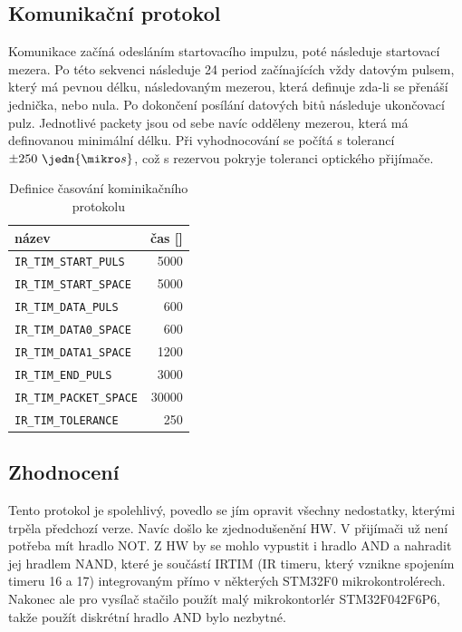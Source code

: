 \subsection{Komunikační protokol}
Komunikace začíná odesláním startovacího impulzu, poté následuje startovací mezera. Po této sekvenci následuje 24 period začínajících vždy datovým pulsem, který má pevnou délku, následovaným mezerou, která definuje zda-li se přenáší jednička, nebo nula. Po dokončení posílání datových bitů následuje ukončovací pulz. Jednotlivé packety jsou od sebe navíc odděleny mezerou, která má definovanou minimální délku. Při vyhodnocování se počítá s tolerancí $\pm250~\jedn{\mikro s}$, což s rezervou pokryje toleranci optického přijímače.

\begin{table}[H]
  \caption{Definice časování kominikačního protokolu}
  \begin{center}
  	\small
	  \begin{tabular}{|l|r|}
	    \hline
	    \textbf{název} & \textbf{čas [\jedn{\mikro s}]} \\\hline\hline
	    \texttt{IR\_TIM\_START\_PULS}       &  5000     \\\hline
	    \texttt{IR\_TIM\_START\_SPACE}      &  5000     \\\hline
	    \texttt{IR\_TIM\_DATA\_PULS}        &   600     \\\hline
	    \texttt{IR\_TIM\_DATA0\_SPACE}      &   600     \\\hline
        \texttt{IR\_TIM\_DATA1\_SPACE}      &  1200     \\\hline
        \texttt{IR\_TIM\_END\_PULS}         &  3000     \\\hline
        \texttt{IR\_TIM\_PACKET\_SPACE}     & 30000     \\\hline
        \texttt{IR\_TIM\_TOLERANCE}         &   250     \\\hline
	  \end{tabular}
  \end{center}
\end{table}



\subsection{Zhodnocení}
Tento protokol je spolehlivý, povedlo se jím opravit všechny nedostatky, kterými trpěla předchozí verze. Navíc došlo ke zjednodušenění HW. V přijímači už není potřeba mít hradlo NOT. Z HW by se mohlo vypustit i hradlo AND a nahradit jej hradlem NAND, které je součástí IRTIM (IR timeru, který vznikne spojením timeru 16 a 17) integrovaným přímo v některých STM32F0 mikrokontrolérech. Nakonec ale pro vysílač stačilo použít malý mikrokontorlér STM32F042F6P6, takže použít diskrétní hradlo AND bylo nezbytné.

